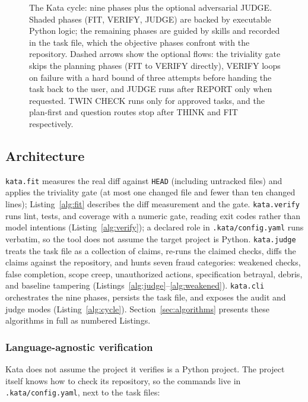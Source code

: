 \documentclass[11pt]{article}
\begin{document}
\begin{figure}[!ht]
{%
}
\caption{The Kata cycle: nine phases plus the optional adversarial JUDGE.
Shaded phases (FIT, VERIFY, JUDGE) are backed by executable Python logic;
the remaining phases are guided by skills and recorded in the task file,
which the objective phases confront with the repository. Dashed arrows show
the optional flows: the triviality gate skips the planning phases (FIT to
VERIFY directly), VERIFY loops on failure with a hard bound of three
attempts before handing the task back to the user, and JUDGE runs after
REPORT only when requested. TWIN CHECK runs only for approved tasks, and
the plan-first and question routes stop after THINK and FIT respectively.}
\label{fig:cycle}
\end{figure}

\subsection{Architecture}

\texttt{kata.fit} measures the real diff against \texttt{HEAD} (including
untracked files) and applies the triviality gate (at most one changed file
and fewer than ten changed lines); Listing~\ref{alg:fit} describes the
diff measurement and the gate. \texttt{kata.verify} runs lint, tests,
and coverage with a numeric gate, reading exit codes rather than model
intentions (Listing~\ref{alg:verify}); a declared role in
\texttt{.kata/config.yaml} runs verbatim, so
the tool does not assume the target project is Python.
\texttt{kata.judge}
treats the task file as a collection of claims, re-runs the claimed checks,
diffs the claims against the repository, and hunts seven fraud categories:
weakened checks, false completion, scope creep, unauthorized actions,
specification betrayal, debris, and baseline tampering
(Listings~\ref{alg:judge}--\ref{alg:weakened}). \texttt{kata.cli}
orchestrates the nine phases, persists the task file, and exposes the audit
and judge modes (Listing~\ref{alg:cycle}). Section~\ref{sec:algorithms}
presents these algorithms in full as numbered Listings.

\subsubsection{Language-agnostic verification}

Kata does not assume the project it verifies is a Python project. The
project itself knows how to check its repository, so the commands live in
\texttt{.kata/config.yaml}, next to the task files:
\end{document}
